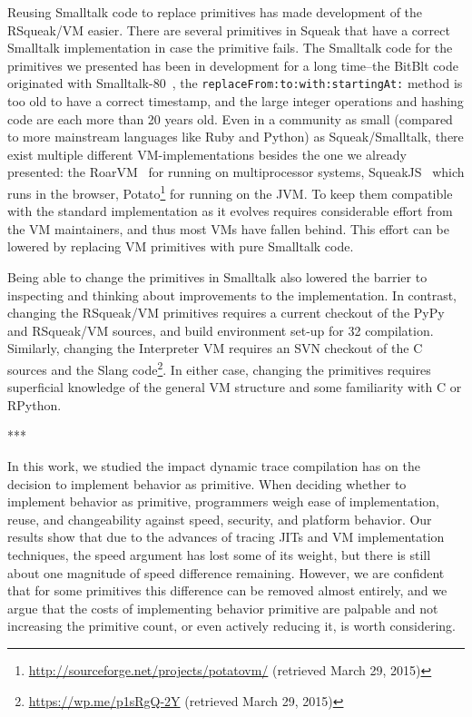 \documentclass[
10pt,          %
]{sigplanconf}
\begin{document}
Reusing Smalltalk code to replace primitives has made development of the
RSqueak/VM easier. There are several primitives in Squeak that have a correct
Smalltalk implementation in case the primitive fails. The Smalltalk code for
the primitives we presented has been in development for a long time\---the
BitBlt code originated with Smalltalk-80~\cite{BlueBook}, the
\verb!replaceFrom:to:with:startingAt:! method is too old to have a correct
timestamp, and the large integer operations and hashing code are each more than
20 years old. Even in a community as small (compared to more mainstream
languages like Ruby and Python) as Squeak/Smalltalk, there exist multiple
different \ac{VM}-implementations besides the one we already presented: the
RoarVM~\cite{RoarVM} for running on multiprocessor systems,
SqueakJS~\cite{SqueakJS} which runs in the browser,
Potato\footnote{\url{http://sourceforge.net/projects/potatovm/} (retrieved
  March 29, 2015)} for running on the \ac{JVM}. To keep them compatible with
the standard implementation as it evolves requires considerable effort from the
\ac{VM} maintainers, and thus most \acp{VM} have fallen behind. This effort can
be lowered by replacing \ac{VM} primitives with pure Smalltalk code.

Being able to change the primitives in Smalltalk also lowered the barrier to
inspecting and thinking about improvements to the implementation. In contrast,
changing the RSqueak/VM primitives requires a current checkout of the PyPy and
RSqueak/VM sources, and build environment set-up for \SI{32}{\bit} compilation.
Similarly, changing the Interpreter \ac{VM} requires an SVN checkout of the C
sources and the Slang code\footnote{\url{https://wp.me/p1sRgQ-2Y} (retrieved
  March 29, 2015)}. In either case, changing the primitives requires
superficial knowledge of the general \ac{VM} structure and some familiarity
with C or RPython.
\begin{center}
***  
\end{center}

In this work, we studied the impact dynamic trace compilation has on
the decision to implement behavior as primitive. When deciding whether
to implement behavior as primitive, programmers weigh ease of
implementation, reuse, and changeability against speed, security, and
platform behavior. Our results show that due to the advances of
tracing \acp{JIT} and \ac{VM} implementation techniques, the speed argument has
lost some of its weight, but there is still about one magnitude of
speed difference remaining. However, we are confident that for some
primitives this difference can be removed almost entirely, and we
argue that the costs of implementing behavior primitive are palpable
and not increasing the primitive count, or even actively reducing it,
is worth considering.
\end{document}
